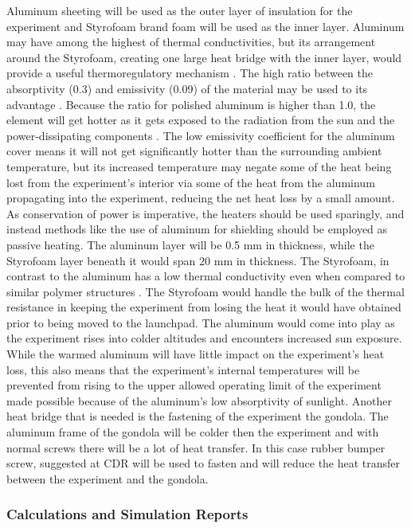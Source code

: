 \documentclass[a4paper,12pt,twoside]{article}
\begin{document}
Aluminum sheeting will be used as the outer layer of insulation for the experiment and Styrofoam brand foam will be used as the inner layer. Aluminum may have among the highest of thermal conductivities, but its arrangement around the Styrofoam, creating one large heat bridge with the inner layer, would provide a useful thermoregulatory mechanism \cite{EngTool}. The high ratio between the absorptivity (0.3) and emissivity (0.09) of the material may be used to its advantage \cite{EngTool}. Because the ratio for polished aluminum is higher than 1.0, the element will get hotter as it gets exposed to the radiation from the sun and the power-dissipating components \cite{RedRok}. The low emissivity coefficient for the aluminum cover means it will not get significantly hotter than the surrounding ambient temperature, but its increased temperature may negate some of the heat being lost from the experiment's interior via some of the heat from the aluminum propagating into the experiment, reducing the net heat loss by a small amount. As conservation of power is imperative, the heaters should be used sparingly, and instead methods like the use of aluminum for shielding should be employed as passive heating. The aluminum layer will be 0.5 mm in thickness, while the Styrofoam layer beneath it would span 20 mm in thickness. The Styrofoam, in contrast to the aluminum has a low thermal conductivity even when compared to similar polymer structures \cite{EngTool}. The Styrofoam would handle the bulk of the thermal resistance in keeping the experiment from losing the heat it would have obtained prior to being moved to the launchpad. The aluminum would come into play as the experiment rises into colder altitudes and encounters increased sun exposure. While the warmed aluminum will have little impact on the experiment's heat loss, this also means that the experiment's internal temperatures will be prevented from rising to the upper allowed operating limit of the experiment made possible because of the aluminum's low absorptivity of sunlight.
Another heat bridge that is needed is the fastening of the experiment the gondola. The aluminum frame of the gondola will be colder then the experiment and with normal screws there will be a lot of heat transfer. In this case rubber bumper screw, suggested at CDR will be used to fasten and will reduce the heat transfer between the experiment and the gondola.


\subsubsection{Calculations and Simulation Reports}
\label{sec:4.6.5}
\end{document}
